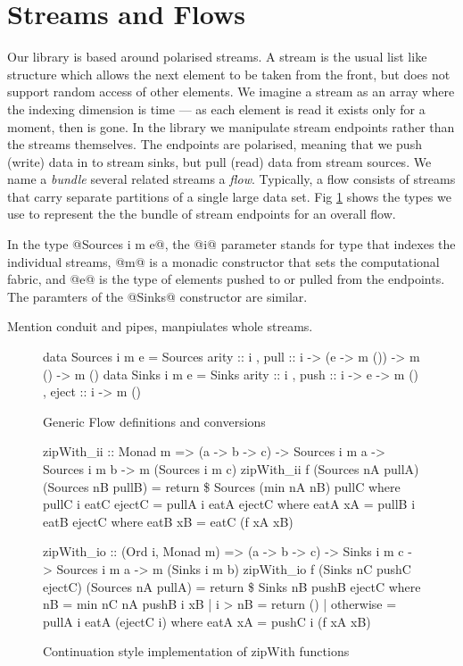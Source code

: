 \section{Streams and Flows}

Our library is based around polarised streams. A stream is the usual list like structure which allows the next element to be taken from the front, but does not support random access of other elements. We imagine a stream as an array where the indexing dimension is time --- as each element is read it exists only for a moment, then is gone. In the library we manipulate stream endpoints rather than the streams themselves. The endpoints are polarised, meaning that we push (write) data in to stream sinks, but pull (read) data from stream sources. We name a \emph{bundle} several related streams a \emph{flow}. Typically, a flow consists of streams that carry separate partitions of a single large data set. Fig \ref{f:GenericFlows} shows the types we use to represent the the bundle of stream endpoints for an overall flow.

In the type @Sources i m e@, the @i@ parameter stands for type that indexes the individual streams, @m@ is a monadic constructor that sets the computational fabric, and @e@ is the type of elements pushed to or pulled from the endpoints. The paramters of the @Sinks@ constructor are similar. 

Mention conduit and pipes, manpiulates whole streams.

\begin{figure}
\begin{code}
data Sources i m e 
   = Sources { arity :: i
             , pull  :: i -> (e -> m ()) -> m () 
                                         -> m () }
data Sinks   i m e 
   = Sinks   { arity :: i
             , push  :: i -> e -> m ()
             , eject :: i -> m () }
\end{code}
\label{f:GenericFlows}
\caption{Generic Flow definitions and conversions}
\end{figure}

\begin{figure}
\begin{code}
zipWith_ii :: Monad m => (a -> b -> c)
           -> Sources i m a -> Sources i m b -> m (Sources i m c)
zipWith_ii f (Sources nA pullA) (Sources nB pullB)
 = return \$ Sources (min nA nB) pullC
 where  pullC i eatC ejectC
         = pullA i eatA ejectC
         where  eatA xA = pullB i eatB ejectC
                 where  eatB xB = eatC (f xA xB)

zipWith_io :: (Ord i, Monad m) => (a -> b -> c)
           -> Sinks i m c -> Sources i m a -> m (Sinks i m b)
zipWith_io f (Sinks nC pushC ejectC) (Sources nA pullA)
 = return \$ Sinks nB pushB ejectC
 where  nB = min nC nA
        pushB i xB 
         | i > nB       = return ()
         | otherwise    = pullA i eatA (ejectC i)
         where  eatA xA = pushC i (f xA xB)
\end{code}
\caption{Continuation style implementation of zipWith functions}
\end{figure}

